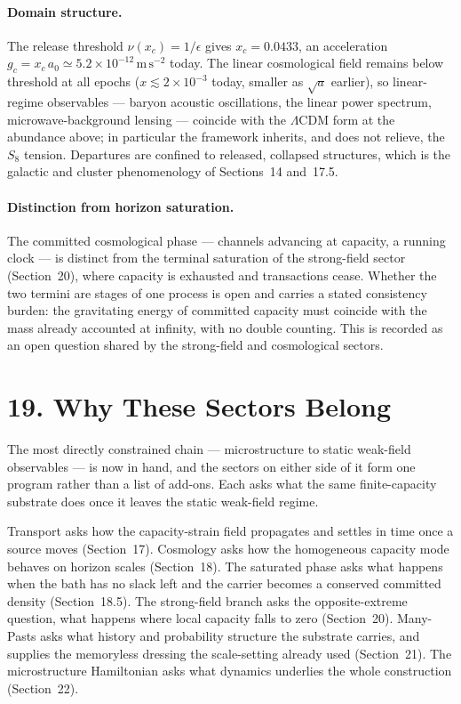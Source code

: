 \documentclass[11pt]{article}
\begin{document}
\paragraph{Domain structure.}
The release threshold $\nu(x_c)=1/\epsilon$ gives $x_c=0.0433$, an acceleration $g_c=x_c\,a_0\simeq5.2\times10^{-12}\,\mathrm{m\,s^{-2}}$ today. The linear cosmological field remains below threshold at all epochs ($x\lesssim2\times10^{-3}$ today, smaller as $\sqrt{a}$ earlier), so linear-regime observables --- baryon acoustic oscillations, the linear power spectrum, microwave-background lensing --- coincide with the $\Lambda$CDM form at the abundance above; in particular the framework inherits, and does not relieve, the $S_8$ tension. Departures are confined to released, collapsed structures, which is the galactic and cluster phenomenology of Sections~14 and~17.5.

\paragraph{Distinction from horizon saturation.}
The committed cosmological phase --- channels advancing at capacity, a running clock --- is distinct from the terminal saturation of the strong-field sector (Section~20), where capacity is exhausted and transactions cease. Whether the two termini are stages of one process is open and carries a stated consistency burden: the gravitating energy of committed capacity must coincide with the mass already accounted at infinity, with no double counting. This is recorded as an open question shared by the strong-field and cosmological sectors.

\section{19. Why These Sectors Belong}

The most directly constrained chain --- microstructure to static weak-field observables --- is now in hand, and the sectors on either side of it form one program rather than a list of add-ons. Each asks what the same finite-capacity substrate does once it leaves the static weak-field regime.

Transport asks how the capacity-strain field propagates and settles in time once a source moves (Section~17). Cosmology asks how the homogeneous capacity mode behaves on horizon scales (Section~18). The saturated phase asks what happens when the bath has no slack left and the carrier becomes a conserved committed density (Section~18.5). The strong-field branch asks the opposite-extreme question, what happens where local capacity falls to zero (Section~20). Many-Pasts asks what history and probability structure the substrate carries, and supplies the memoryless dressing the scale-setting already used (Section~21). The microstructure Hamiltonian asks what dynamics underlies the whole construction (Section~22).
\end{document}
